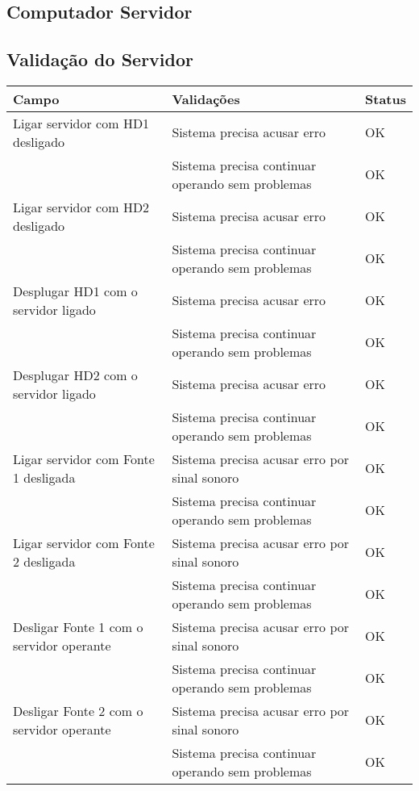 \subsection{Computador Servidor}
\label{sec:alvo_servidor}

\subsection{Validação do Servidor}
\label{sec:validacao_servidor}

\begin{longtable}{|p{}|p{}|p{}|}
\hline

Campo & Validações & Status \\ \hline

Ligar servidor com HD1 desligado & Sistema precisa acusar erro & OK \\ \cline{2-3}  & Sistema precisa continuar operando sem problemas & OK \\ \hline

Ligar servidor com HD2 desligado & Sistema precisa acusar erro & OK \\ \cline{2-3}  & Sistema precisa continuar operando sem problemas & OK \\ \hline

Desplugar HD1 com o servidor ligado & Sistema precisa acusar erro & OK \\ \cline{2-3}  & Sistema precisa continuar operando sem problemas & OK \\ \hline

Desplugar HD2 com o servidor ligado & Sistema precisa acusar erro & OK \\ \cline{2-3}  & Sistema precisa continuar operando sem problemas & OK \\ \hline

Ligar servidor com Fonte 1 desligada & Sistema precisa acusar erro por sinal sonoro & OK \\ \cline{2-3}  & Sistema precisa continuar operando sem problemas & OK \\ \hline

Ligar servidor com Fonte 2 desligada & Sistema precisa acusar erro por sinal sonoro & OK \\ \cline{2-3}  & Sistema precisa continuar operando sem problemas & OK \\ \hline

Desligar Fonte 1 com o servidor operante & Sistema precisa acusar erro por sinal sonoro & OK \\ \cline{2-3}  & Sistema precisa continuar operando sem problemas & OK \\ \hline

Desligar Fonte 2 com o servidor operante & Sistema precisa acusar erro por sinal sonoro & OK \\ \cline{2-3}  & Sistema precisa continuar operando sem problemas & OK \\ \hline

\end{longtable}
